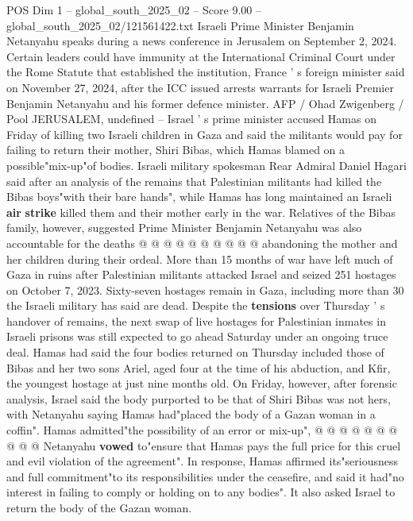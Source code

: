 \begin{textsample}{POS Dim 1 – global\_south\_2025\_02 – Score 9.00 – global\_south\_2025\_02/121561422.txt}  \label{ex:f1_pos_369}
Israeli Prime Minister Benjamin Netanyahu speaks during a news conference in Jerusalem on September 2, 2024.
Certain leaders could have immunity at the International Criminal Court under the Rome Statute that established the institution, France ' s foreign minister said on November 27, 2024, after the ICC issued arrests warrants for Israeli Premier Benjamin Netanyahu and his former defence minister.
AFP / Ohad Zwigenberg / Pool JERUSALEM, undefined -- Israel ' s prime minister accused Hamas on Friday of killing two Israeli children in Gaza and said the militants would pay for failing to return their mother, Shiri Bibas, which Hamas blamed on a possible"mix-up"of bodies.
Israeli military spokesman Rear Admiral Daniel Hagari said after an analysis of the remains that Palestinian militants had killed the Bibas boys"with their bare hands", while Hamas has long maintained an Israeli \textbf{air} \textbf{strike} killed them and their mother early in the war.
Relatives of the Bibas family, however, suggested Prime Minister Benjamin Netanyahu was also accountable for the deaths @ @ @ @ @ @ @ @ @ @ abandoning the mother and her children during their ordeal.
More than 15 months of war have left much of Gaza in ruins after Palestinian militants attacked Israel and seized 251 hostages on October 7, 2023.
Sixty-seven hostages remain in Gaza, including more than 30 the Israeli military has said are dead.
Despite the \textbf{tensions} over Thursday ' s handover of remains, the next swap of live hostages for Palestinian inmates in Israeli prisons was still expected to go ahead Saturday under an ongoing truce deal.
Hamas had said the four bodies returned on Thursday included those of Bibas and her two sons Ariel, aged four at the time of his abduction, and Kfir, the youngest hostage at just nine months old.
On Friday, however, after forensic analysis, Israel said the body purported to be that of Shiri Bibas was not hers, with Netanyahu saying Hamas had"placed the body of a Gazan woman in a coffin".
Hamas admitted"the possibility of an error or mix-up", @ @ @ @ @ @ @ @ @ @ Netanyahu \textbf{vowed} to"ensure that Hamas pays the full price for this cruel and evil violation of the agreement".
In response, Hamas affirmed its"seriousness and full commitment"to its responsibilities under the ceasefire, and said it had"no interest in failing to comply or holding on to any bodies".
It also asked Israel to return the body of the Gazan woman.

\end{textsample}
